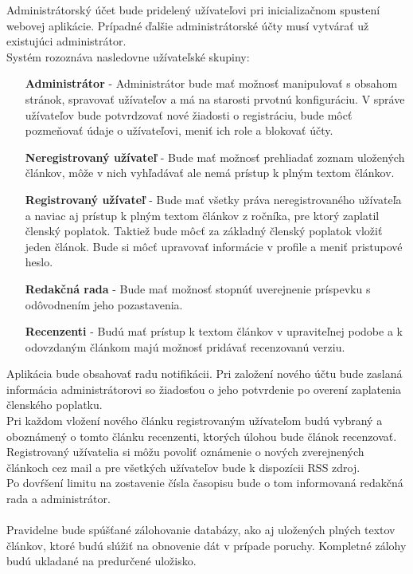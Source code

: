 Administrátorský účet bude pridelený užívateľovi pri inicializačnom spustení webovej aplikácie. Prípadné ďalšie administrátorské účty musí vytvárať už existujúci administrátor.\\
Systém rozoznáva nasledovne užívateľské skupiny:
\begin{itemize}
 \item[\textbf{Administrátor}] - Administrátor bude mať možnosť manipulovať s obsahom stránok, spravovať užívateľov a má na starosti prvotnú konfiguráciu. V správe užívateľov bude potvrdzovať nové žiadosti o registráciu, bude môcť pozmeňovať údaje o užívateľovi, meniť ich role a blokovať účty.
\item[\textbf{Neregistrovaný užívateľ}] - Bude mať možnosť prehliadať zoznam uložených článkov, môže v nich vyhľadávať ale nemá prístup k plným textom článkov.
\item[\textbf{Registrovaný užívateľ}] - Bude mať všetky práva neregistrovaného užívateľa a naviac aj prístup k plným textom článkov z ročníka, pre ktorý zaplatil členský poplatok. Taktiež bude môcť za základný členský poplatok vložiť jeden článok. Bude si môcť upravovať informácie v profile a meniť pristupové heslo.
\item[\textbf{Redakčná rada}] - Bude mať možnosť stopnúť uverejnenie príspevku s odôvodnením jeho pozastavenia.
\item[\textbf{Recenzenti}] - Budú mať prístup k textom článkov v upraviteľnej podobe a k odovzdaným článkom majú možnosť pridávať recenzovanú verziu.
\end{itemize}

Aplikácia bude obsahovať radu notifikácii. Pri založení nového účtu bude zaslaná informácia administrátorovi so žiadosťou o jeho potvrdenie po overení zaplatenia členského poplatku.\\
Pri každom vložení nového článku registrovaným užívateľom budú vybraný a oboznámený o tomto článku recenzenti, ktorých úlohou bude článok recenzovať.\\
Registrovaný užívatelia si môžu povoliť oznámenie o nových zverejnených článkoch cez mail a pre všetkých užívateľov bude k dispozícii RSS zdroj. \\
Po dovŕšení limitu na zostavenie čísla časopisu bude o tom informovaná redakčná rada a administrátor. \\ \\

Pravidelne bude spúšťané zálohovanie databázy, ako aj uložených plných textov článkov, ktoré budú slúžiť na obnovenie dát v prípade poruchy. Kompletné zálohy budú ukladané na predurčené uložisko. \\ \\

